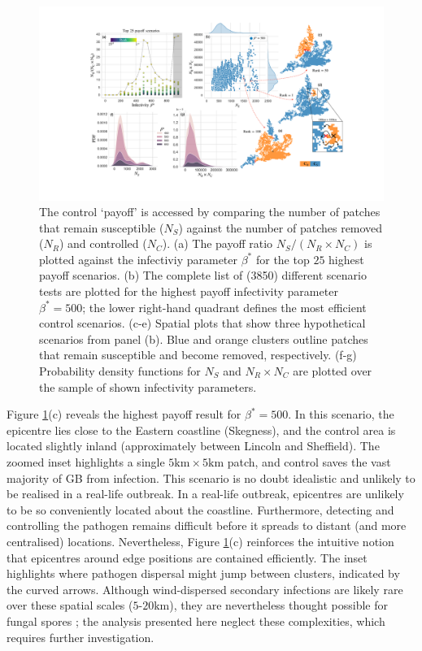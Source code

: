 \begin{landscape}
\begin{figure}
    \centering
    \includegraphics[scale=0.47]{chapter7/figures/figure4-scenario-payoff.pdf}
    \caption{The control `payoff' is accessed by comparing the number of patches that remain susceptible ($N_S$) against the number of patches removed ($N_R$) and controlled ($N_C$).
             (a) The payoff ratio $N_S / (N_R \times N_C)$ is plotted against the infectiviy parameter $\beta^*$ for the top $25$ highest payoff scenarios.
             (b) The complete list of (3850) different scenario tests are plotted for the highest payoff infectivity parameter $\beta^*=500$; the lower right-hand quadrant defines the most efficient control scenarios.
             (c-e) Spatial plots that show three hypothetical scenarios from panel (b). 
             Blue and orange clusters outline patches that remain susceptible and become removed, respectively.
             (f-g) Probability density functions for $N_S$ and $N_R \times N_C$ are plotted over the sample of shown infectivity parameters.
             }
    \label{fig:payoff-efficiency}
\end{figure}
\end{landscape}

Figure \ref{fig:payoff-efficiency}(c) reveals the highest payoff result for $\beta^*=500$.
In this scenario, the epicentre lies close to the Eastern coastline (Skegness), 
and the control area is located slightly inland (approximately between Lincoln and Sheffield).
The zoomed inset highlights a single $\mathrm{5km \times 5 km}$ patch, and control saves the vast majority of GB from infection.
This scenario is no doubt idealistic and unlikely to be realised in a real-life outbreak.
In a real-life outbreak, epicentres are unlikely to be so conveniently located about the coastline.
Furthermore, detecting and controlling the pathogen remains difficult before it spreads to distant (and more centralised) locations.
Nevertheless, Figure \ref{fig:payoff-efficiency}(c) reinforces the intuitive notion that epicentres around edge positions are contained efficiently.
The inset highlights where pathogen dispersal might jump between clusters, indicated by the curved arrows.
Although wind-dispersed secondary infections are likely rare over these spatial scales ($5$-$20\mathrm{km}$), they are nevertheless thought possible for fungal spores \cite{grosdidier2018tracking};
the analysis presented here neglect these complexities, which requires further investigation.

